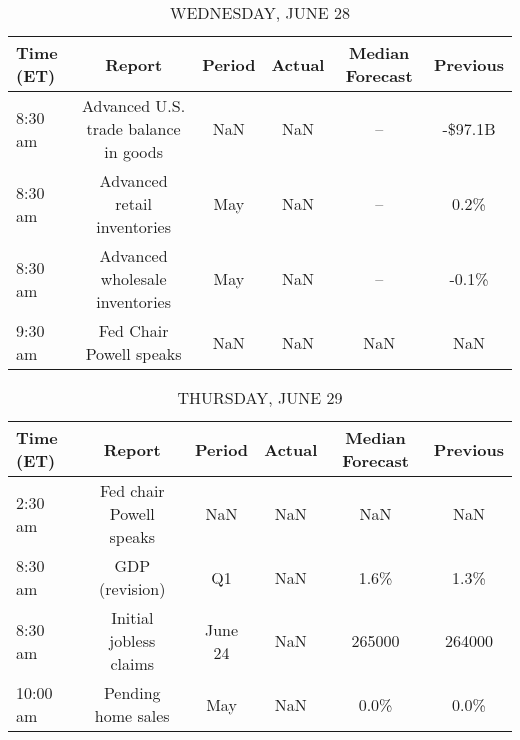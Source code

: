 \documentclass{article}%
\begin{document}
\begin{table}[htbp]%
\caption{WEDNESDAY, JUNE 28}%
\centering%
\begin{adjustbox}{width=1\textwidth}%
\begin{tabular}{lccccc}
\toprule
Time (ET) &                               Report & Period & Actual & Median Forecast & Previous \\
\midrule
  8:30 am & Advanced U.S. trade balance in goods &    NaN &    NaN &              -- &  -\$97.1B \\
  8:30 am &          Advanced retail inventories &    May &    NaN &              -- &     0.2\% \\
  8:30 am &       Advanced wholesale inventories &    May &    NaN &              -- &    -0.1\% \\
  9:30 am &              Fed Chair Powell speaks &    NaN &    NaN &             NaN &      NaN \\
\bottomrule
\end{tabular}
%
\end{adjustbox}%
\end{table}

%


\begin{table}[htbp]%
\caption{THURSDAY, JUNE 29}%
\centering%
\begin{adjustbox}{width=1\textwidth}%
\begin{tabular}{lccccc}
\toprule
Time (ET) &                  Report &  Period & Actual & Median Forecast & Previous \\
\midrule
  2:30 am & Fed chair Powell speaks &     NaN &    NaN &             NaN &      NaN \\
  8:30 am &          GDP (revision) &      Q1 &    NaN &            1.6\% &     1.3\% \\
  8:30 am &  Initial jobless claims & June 24 &    NaN &          265000 &   264000 \\
 10:00 am &      Pending home sales &     May &    NaN &            0.0\% &     0.0\% \\
\bottomrule
\end{tabular}
%
\end{adjustbox}%
\end{table}

%
\end{document}
